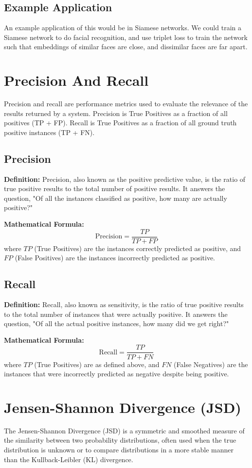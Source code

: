 \documentclass[12pt]{article}
\begin{document}
\subsection{Example Application}
An example application of this would be in Siamese networks. We could train a Siamese network to do facial recognition, and use triplet loss to train the network such that embeddings of similar faces are close, and dissimilar faces are far apart.
\section {Precision And Recall}
Precision and recall are performance metrics used to evaluate the relevance of the results returned by a system. Precision is True Positives as a fraction of all positives (TP + FP). Recall is True Positives as a fraction of all ground truth positive instances (TP + FN).

\subsection{Precision}
\textbf{Definition:} Precision, also known as the positive predictive value, is the ratio of true positive results to the total number of positive results. It answers the question, "Of all the instances classified as positive, how many are actually positive?"

\textbf{Mathematical Formula:}
\[ \text{Precision} = \frac{TP}{TP + FP} \]
where \(TP\) (True Positives) are the instances correctly predicted as positive, and \(FP\) (False Positives) are the instances incorrectly predicted as positive.

\subsection{Recall}
\textbf{Definition:} Recall, also known as sensitivity, is the ratio of true positive results to the total number of instances that were actually positive. It answers the question, "Of all the actual positive instances, how many did we get right?"

\textbf{Mathematical Formula:}
\[ \text{Recall} = \frac{TP}{TP + FN} \]
where \(TP\) (True Positives) are as defined above, and \(FN\) (False Negatives) are the instances that were incorrectly predicted as negative despite being positive.

\section {Jensen-Shannon Divergence (JSD)}
The Jensen-Shannon Divergence (JSD) is a symmetric and smoothed measure of the similarity between two probability distributions, often used when the true distribution is unknown or to compare distributions in a more stable manner than the Kullback-Leibler (KL) divergence.
\end{document}
